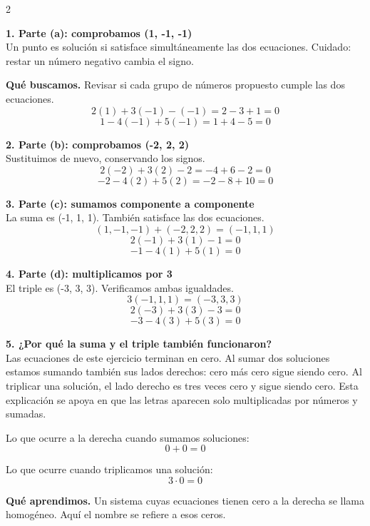 \documentclass[11pt,a4paper,landscape]{article}
\begin{document}
\begin{multicols*}{2}
\noindent\begin{minipage}{\linewidth}\textbf{1. Parte (a): comprobamos (1, -1, -1)}\\[2pt]Un punto es solución si satisface simultáneamente las dos ecuaciones. Cuidado: restar un número negativo cambia el signo.
\par\smallskip\textbf{Qué buscamos.} Revisar si cada grupo de números propuesto cumple las dos ecuaciones.
\[2(1)+3(-1)-(-1)=2-3+1=0\]
\[1-4(-1)+5(-1)=1+4-5=0\]
\end{minipage}\par\medskip
\noindent\begin{minipage}{\linewidth}\textbf{2. Parte (b): comprobamos (-2, 2, 2)}\\[2pt]Sustituimos de nuevo, conservando los signos.
\[2(-2)+3(2)-2=-4+6-2=0\]
\[-2-4(2)+5(2)=-2-8+10=0\]
\end{minipage}\par\medskip
\noindent\begin{minipage}{\linewidth}\textbf{3. Parte (c): sumamos componente a componente}\\[2pt]La suma es (-1, 1, 1). También satisface las dos ecuaciones.
\[(1,-1,-1)+(-2,2,2)=(-1,1,1)\]
\[2(-1)+3(1)-1=0\]
\[-1-4(1)+5(1)=0\]
\end{minipage}\par\medskip
\noindent\begin{minipage}{\linewidth}\textbf{4. Parte (d): multiplicamos por 3}\\[2pt]El triple es (-3, 3, 3). Verificamos ambas igualdades.
\[3(-1,1,1)=(-3,3,3)\]
\[2(-3)+3(3)-3=0\]
\[-3-4(3)+5(3)=0\]
\end{minipage}\par\medskip
\noindent\begin{minipage}{\linewidth}\textbf{5. ¿Por qué la suma y el triple también funcionaron?}\\[2pt]Las ecuaciones de este ejercicio terminan en cero. Al sumar dos soluciones estamos sumando también sus lados derechos: cero más cero sigue siendo cero. Al triplicar una solución, el lado derecho es tres veces cero y sigue siendo cero. Esta explicación se apoya en que las letras aparecen solo multiplicadas por números y sumadas.
\par\smallskip Lo que ocurre a la derecha cuando sumamos soluciones:
\[0+0=0\]
\par\smallskip Lo que ocurre cuando triplicamos una solución:
\[3\cdot0=0\]
\par\smallskip\textbf{Qué aprendimos.} Un sistema cuyas ecuaciones tienen cero a la derecha se llama homogéneo. Aquí el nombre se refiere a esos ceros.

\end{minipage}
\end{multicols*}
\end{document}
